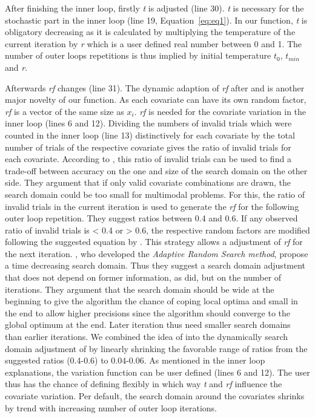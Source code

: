 After finishing the inner loop, firstly \textit{t} is adjusted (line 30). \textit{t} is necessary for the stochastic part in the inner loop (line 19, Equation~\eqref{eq:eq1}). In our function, \textit{t} is obligatory decreasing as it is calculated by multiplying the temperature of the current iteration by \textit{r} which is a user defined real number between 0 and 1. The number of outer loops repetitions is thus implied by initial temperature $t_0$, $t_{min}$ and \textit{r}.

Afterwards \textit{rf} changes (line 31). The dynamic adaption of \textit{rf} after \citet{corana_1987} and \citet{pronzato_1984} is another major novelty of our function. As each covariate can have its own random factor, \textit{rf} is a vector of the same size as $x_i$. \textit{rf} is needed for the covariate variation in the inner loop (lines 6 and 12). Dividing the numbers of invalid trials which were counted in the inner loop (line 13) distinctively for each covariate by the total number of trials of the respective covariate gives the ratio of invalid trials for each covariate. According to \citep{corana_1987}, this ratio of invalid trials can be used to find a trade-off between accuracy on the one and size of the search domain on the other side. They argument that if only valid covariate combinations are drawn, the search domain could be too small for multimodal problems. For this, the ratio of invalid trials in the current iteration is used to generate the \textit{rf} for the following outer loop repetition. They suggest ratios between 0.4 and 0.6. If any observed ratio of invalid trials is < 0.4 or > 0.6, the respective random factors are modified following the suggested equation by \citet{corana_1987}. This strategy allows a adjustment of \textit{rf} for the next iteration. \citet{pronzato_1984}, who developed the \emph{Adaptive Random Search method}, propose a time decreasing search domain. Thus they suggest a search domain adjustment that does not depend on former information, as \citet{corana_1987} did, but on the number of iterations. They argument that the search domain should be wide at the beginning to give the algorithm the chance of coping local optima and small in the end to allow higher precisions since the algorithm should converge to the global optimum at the end. Later iteration thus need smaller search domains than earlier iterations. We combined the idea of \citet{pronzato_1984} into the dynamically search domain adjustment of \citep{corana_1987} by linearly shrinking the favorable range of ratios from the suggested ratios (0.4-0.6) to 0.04-0.06. As mentioned in the inner loop explanations, the variation function can be user defined (lines 6 and 12). The user thus has the chance of defining flexibly in which way \textit{t} and \textit{rf} influence the covariate variation. Per default, the search domain around the covariates shrinks by trend with increasing number of outer loop iterations.

